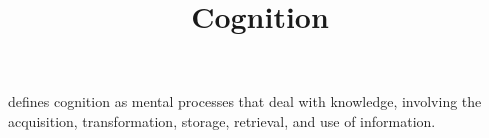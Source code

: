 \documentclass[a4paper]{article}
\title{Cognition}
\date{}
\begin{document}
    \maketitle
    
    \cite{revlin-2012-cognition-theory-and-practice} defines cognition as mental processes that deal with knowledge, involving the acquisition, transformation, storage, retrieval, and use of information.
\end{document}
